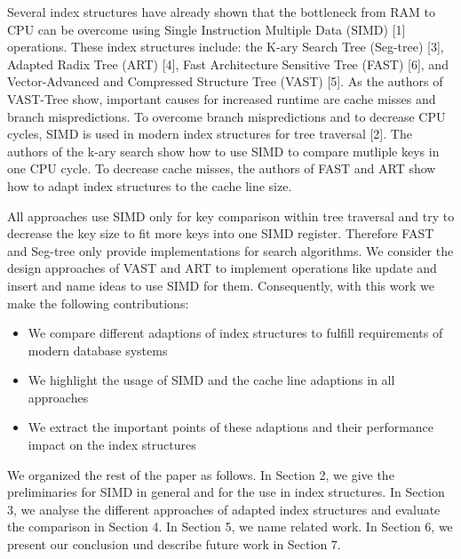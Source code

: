 \documentclass[conference]{IEEEtran}
\begin{document}
Several index structures have already shown that the bottleneck from RAM to CPU can be overcome using Single Instruction Multiple Data (SIMD) [1] operations. These index structures include: the K-ary Search Tree (Seg-tree) [3], Adapted Radix Tree (ART) [4], Fast Architecture Sensitive Tree (FAST) [6], and Vector-Advanced and Compressed Structure Tree (VAST) [5]. As the authors of VAST-Tree show, important causes for increased runtime are cache misses and branch mispredictions. To overcome branch mispredictions and to decrease CPU cycles, SIMD  is used in modern index structures for tree traversal [2]. The authors of the k-ary search show how to use SIMD to compare mutliple keys in one CPU cycle. To decrease cache misses, the authors of FAST and ART show how to adapt index structures to the cache line size.  

All approaches use SIMD only for key comparison within tree traversal and try to decrease the key size to fit more keys into one SIMD register. Therefore FAST and Seg-tree only provide implementations for search algorithms. We consider the design approaches of VAST and ART to implement operations like update and insert and name ideas to use SIMD for them. Consequently, with this work we make the following contributions:
\begin{itemize}
	\item We compare different adaptions of index structures to fulfill requirements of modern database systems
	\item We highlight the usage of SIMD and the cache line adaptions in all approaches
	\item We extract the important points of these adaptions and their performance impact on the index structures
\end{itemize}
We organized the rest of the paper as follows. In Section 2, we give the preliminaries for SIMD in general and for the use in index structures. In Section 3, we analyse the different approaches of adapted index structures and evaluate the comparison in Section 4. In Section 5, we name related work. In Section 6, we present our conclusion und describe future work in Section 7. 
\end{document}
